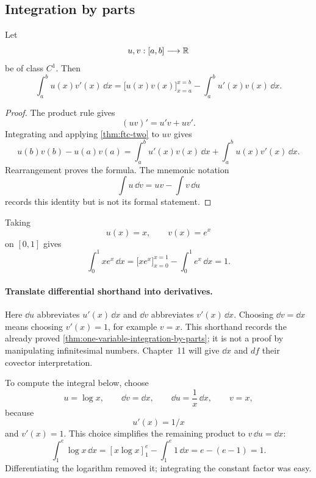 \subsection{Integration by parts}

\begin{theorem}
\label{thm:one-variable-integration-by-parts}
Let
\[
u,v:[a,b]\longrightarrow\mathbb{R}
\]
be of class \(C^1\).  Then
\[
\int_a^b u(x)v'(x)\,\dd x
=
\bigl[u(x)v(x)\bigr]_{x=a}^{x=b}
-
\int_a^b u'(x)v(x)\,\dd x.
\]
\end{theorem}
\begin{proof}
The product rule gives
\[
(uv)'=u'v+uv'.
\]
Integrating and applying \cref{thm:ftc-two} to \(uv\) gives
\[
u(b)v(b)-u(a)v(a)
=
\int_a^b u'(x)v(x)\,\dd x
+
\int_a^b u(x)v'(x)\,\dd x.
\]
Rearrangement proves the formula.  The mnemonic notation
\[
\int u\,\dd v=uv-\int v\,\dd u
\]
records this identity but is not its formal statement.
\end{proof}

\begin{example}
Taking
\[
u(x)=x,
\qquad
v(x)=e^x
\]
on \([0,1]\) gives
\[
\int_0^1 xe^x\,\dd x
=
\bigl[xe^x\bigr]_{x=0}^{x=1}
-
\int_0^1e^x\,\dd x
=1.
\]
\end{example}
\paragraph{Translate differential shorthand into derivatives.}
Here $\dd u$ abbreviates $u'(x)\,\dd x$ and $\dd v$ abbreviates
$v'(x)\,\dd x$. Choosing $\dd v=\dd x$ means choosing $v'(x)=1$,
for example $v=x$. This shorthand records the already proved
\cref{thm:one-variable-integration-by-parts}; it is not a proof by
manipulating infinitesimal numbers. Chapter~11 will give $\dd x$ and
$df$ their covector interpretation.
\begin{example}
To compute the integral below, choose
\[
u=\log x,\qquad \dd v=\dd x,\qquad
\dd u=\frac1x\,\dd x,\qquad v=x,
\]
because
\[
u'(x)=1/x
\]
 and $v'(x)=1$. This choice simplifies the remaining
product to $v\,\dd u=\dd x$:
\[
\int_1^e\log x\,\dd x=[x\log x]_1^e-\int_1^e1\,\dd x
=e-(e-1)=1.
\]
Differentiating the logarithm removed it; integrating the constant factor was easy.
\end{example}

